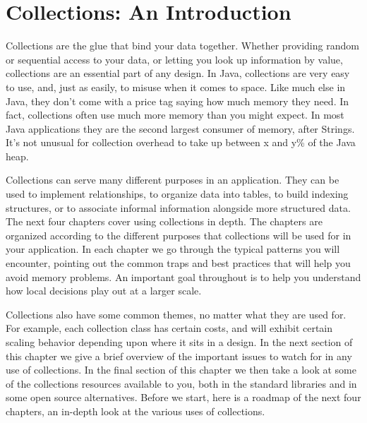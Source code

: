 \chapter{Collections: An Introduction}
\label{chapter:brief-introduction-collections}

Collections are the glue that bind your data together.  Whether 
providing random or sequential access to your data, or letting you
look up information by value, collections are an essential part of any
design. In Java, collections are very easy to use, and, just as easily, to misuse when
it comes to space. Like much else in Java, they don't come with a price tag
saying how much memory they need. In fact, collections
often use much more memory than you might expect. In most Java applications they are the second largest consumer of memory, after
Strings. It's not unusual for collection overhead to take up between x and y\%
of the Java heap.

Collections can serve many different purposes in an application. They can be
used to implement relationships, to organize data into tables, to build indexing
structures, or to associate informal information alongside more structured
data. The next four chapters cover using collections in depth. The chapters are
organized according to the different purposes that collections will be used
for in your application. In each chapter we go through the typical patterns you
will encounter, pointing out the common traps and best practices that will help you avoid memory problems. An
important goal throughout is to help you understand how local decisions
play out at a larger scale.  

Collections also have some common themes, no
matter what they are used for. For example, each collection class has certain
costs, and will exhibit certain scaling behavior depending upon where it
sits in a design. In the next section of this chapter we give a
brief overview of the important issues to watch for in any use of collections. In the final section
of this chapter we then take a look at some of the collections resources available to you,
both in the standard libraries and in some open source alternatives. Before we
start, here is a roadmap of the next four chapters, an in-depth look at the
various uses of collections.



